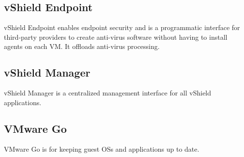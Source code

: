 \subsection{vShield Endpoint}

vShield Endpoint enables endpoint security and is a programmatic interface for
third-party providers to create anti-virus software without having to install
agents on each VM. It offloads anti-virus processing.

\subsection{vShield Manager}

vShield Manager is a centralized management interface for all vShield
applications.

\subsection{VMware Go}

VMware Go is for keeping guest OSs and applications up to date.
